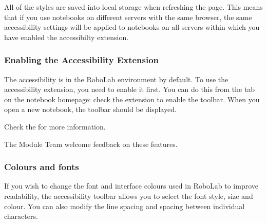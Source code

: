 \documentclass[letterpaper,10pt,english]{sphinxmanual}
\let\sphinxpxdimen\pdfpxdimen\else\newdimen\sphinxpxdimen
\begin{document}

All of the styles are saved into local storage when refreshing the page. This means that if you use notebooks on different servers with the same browser, the same accessibility settings will be applied to notebooks on all servers within which you have enabled the accessibilty extension.


\subsubsection{Enabling the Accessibility Extension}
\label{\detokenize{content/00_READ_ME_FIRST/Section_00_03_Accessibility:Enabling-the-Accessibility-Extension}}
The accessibility is  in the RoboLab environment by default. To use the accessibility extension, you need to enable it first. You can do this from the  tab on the notebook homepage: check the  extension to enable the toolbar. When you open a new notebook, the toolbar should be displayed.

\sphinxincludegraphics[width=2344\sphinxpxdimen,height=1326\sphinxpxdimen]{{00_01_nb_extensions_accessibility}.png}

Check the  for more information.

The Module Team welcome feedback on these features.


\subsubsection{Colours and fonts}
\label{\detokenize{content/00_READ_ME_FIRST/Section_00_03_Accessibility:Colours-and-fonts}}
If you wish to change the font and interface colours used in RoboLab to improve readability, the accessibility toolbar allows you to select the font style, size and colour. You can also modify the line spacing and spacing between individual characters.
\end{document}
